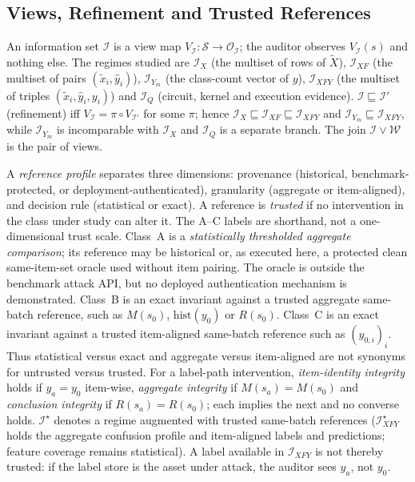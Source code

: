 \documentclass[10pt,journal,compsoc]{IEEEtran}
\newcommand{\IX}{\mathcal I_X}
\newcommand{\IXF}{\mathcal I_{XF}}
\newcommand{\IYm}{\mathcal I_{Y_m}}
\newcommand{\IXFY}{\mathcal I_{XFY}}
\newcommand{\IXFYs}{\mathcal I_{XFY}^{\star}}
\newcommand{\IQ}{\mathcal I_Q}
\begin{document}
\subsection{Views, Refinement and Trusted References}

An information set $\mathcal I$ is a view map
$V_{\mathcal I}:\mathcal S\to\mathcal O_{\mathcal I}$; the auditor observes
$V_{\mathcal I}(s)$ and nothing else. The regimes studied are $\IX$
(the multiset of rows of $\tilde X$), $\IXF$ (the multiset of pairs
$(\tilde x_i,\hat y_i)$), $\IYm$ (the class-count vector of $y$), $\IXFY$ (the
multiset of triples $(\tilde x_i,\hat y_i,y_i)$) and $\IQ$ (circuit, kernel
and execution evidence). $\mathcal I\sqsubseteq\mathcal I'$ (refinement) iff
$V_{\mathcal I}=\pi\circ V_{\mathcal I'}$ for some $\pi$; hence
$\IX\sqsubseteq\IXF\sqsubseteq\IXFY$ and $\IYm\sqsubseteq\IXFY$, while $\IYm$
is incomparable with $\IX$ and $\IQ$ is a separate branch. The join
$\mathcal I\vee\mathcal W$ is the pair of views.

A \emph{reference profile} separates three dimensions: provenance
(historical, benchmark-protected, or deployment-authenticated), granularity
(aggregate or item-aligned), and decision rule (statistical or exact).
A reference is \emph{trusted} if no intervention in the class under study can
alter it. The A--C labels are shorthand, not a one-dimensional trust scale.
Class~A is a \emph{statistically thresholded aggregate comparison}; its
reference may be historical or, as executed here, a protected clean
same-item-set oracle used without item pairing. The oracle is outside the
benchmark attack API, but no deployed authentication mechanism is
demonstrated. Class~B is an exact invariant against a trusted aggregate
same-batch reference, such as $M(s_0)$, $\mathrm{hist}(y_0)$ or $R(s_0)$.
Class~C is an exact invariant against a trusted item-aligned same-batch
reference such as $(y_{0,i})_i$. Thus statistical versus exact and aggregate
versus item-aligned are not synonyms for untrusted versus trusted. For a label-path
intervention, \emph{item-identity integrity} holds if $y_a=y_0$ item-wise,
\emph{aggregate integrity} if $M(s_a)=M(s_0)$ and \emph{conclusion
integrity} if $R(s_a)=R(s_0)$; each implies the next and no converse holds.
$\mathcal I^{\star}$ denotes a regime augmented with trusted same-batch
references ($\IXFYs$ holds the aggregate confusion profile and item-aligned
labels and predictions; feature coverage remains statistical). A label
available in $\IXFY$ is not thereby trusted: if the label store is the asset
under attack, the auditor sees $y_a$, not $y_0$.
\end{document}

